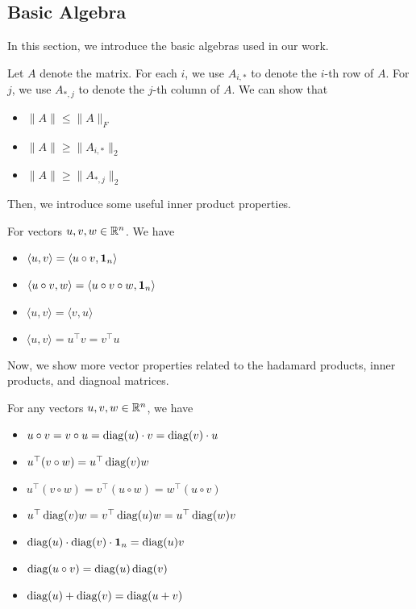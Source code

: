 \subsection{Basic Algebra}
In this section, we introduce the basic algebras used in our work.

\begin{fact}
Let $A$ denote the matrix. For each $i$, we use $A_{i,*}$ to denote the $i$-th row of $A$. For $j$, we use $A_{*,j}$ to denote the $j$-th column of $A$. 
We can show that
\begin{itemize}
    \item $\| A \| \leq \| A \|_F$
    \item $\| A \| \geq \| A_{i,*} \|_2$
    \item $\| A \| \geq \| A_{*,j} \|_2$
\end{itemize}
\end{fact}

Then, we introduce some useful inner product properties.

\begin{fact}
    For vectors $u,v,w \in \mathbb{R}^n$. We have 
    \begin{itemize}
        \item $\langle u, v \rangle = \langle u \circ v, {\bf 1}_n \rangle$
        \item $\langle u \circ v, w \rangle = \langle u \circ v \circ w, {\bf 1}_n \rangle$ 
        \item $\langle u, v \rangle = \langle v, u \rangle$
        \item $\langle u , v \rangle = u^\top v = v^\top u$
    \end{itemize}
\end{fact}

Now, we show more vector properties related to the hadamard products, inner products, and diagnoal matrices.
\begin{fact}
    For any vectors $u, v, w \in \mathbb{R}^n$, we have
    \begin{itemize}
        \item $u \circ v = v \circ u = \operatorname{diag}(u) \cdot v = \operatorname{diag}(v) \cdot u$
        \item $u^\top (v\circ w) = u^\top \operatorname{diag}(v) w$
        \item $u^\top (v\circ w) = v^\top (u \circ w) = w^\top (u \circ v)$
        \item $u^\top \operatorname{diag}(v) w = v^\top \operatorname{diag}(u) w = u^\top \operatorname{diag}(w) v$
        \item $\operatorname{diag}(u) \cdot \operatorname{diag}(v) \cdot {\bf 1}_n = \operatorname{diag}(u) v$
        \item $\operatorname{diag}(u \circ v) = \operatorname{diag}(u) \operatorname{diag}(v)$
        \item $\operatorname{diag}(u) + \operatorname{diag}(v) = \operatorname{diag}(u+v)$
    \end{itemize}
\end{fact}


